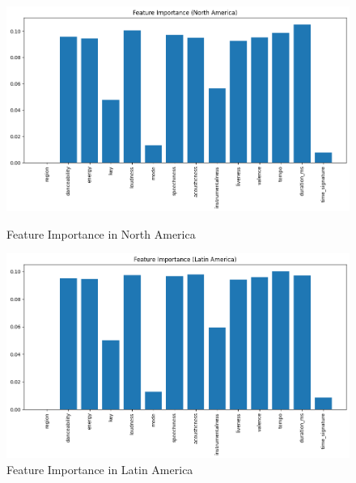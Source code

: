 \begin{figure}[h]
    \centering
    \begin{minipage}{0.45\textwidth}
        \centering
        \includegraphics[width=\linewidth]{media/rf_feature_imp_north_america.png}
        \caption{Feature Importance in North America}
    \end{minipage}%
    \hspace{0.05\textwidth} %
    \begin{minipage}{0.45\textwidth}
        \centering
        \includegraphics[width=\linewidth]{media/rf_feature_imp_latin_america.png}
        \caption{Feature Importance in Latin America}
    \end{minipage}
\end{figure}


